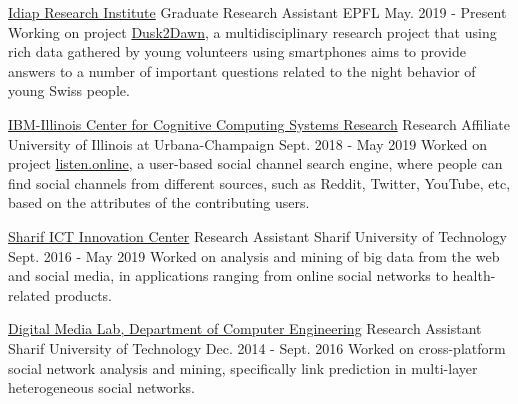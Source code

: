 \begin{cventries}

  \cventry
    {\href{https://idiap.ch}{Idiap Research Institute}}
    {Graduate Research Assistant}
    {EPFL}
    {May. 2019 - Present}
    {
      Working on project \href{http://www.idiap.ch/project/dusk2dawn/}{Dusk2Dawn}, a multidisciplinary research project that using rich data gathered by young volunteers using smartphones aims to provide answers to a number of important questions related to the night behavior of young Swiss people. 
    }

  \cventry
    {\href{https://www.c3sr.com/participants/}{IBM-Illinois Center for Cognitive Computing Systems Research}}
    {Research Affiliate}
    {University of Illinois at Urbana-Champaign}
    {Sept. 2018 - May 2019}
    {
      Worked on project \href{http://listen.online}{listen.online}, a user-based social channel search engine, where people can find social channels from different sources, such as Reddit, Twitter, YouTube, etc, based on the attributes of the contributing users. %
    }
    
  \cventry
    {\href{https://www.linkedin.com/company/sharif-ict-innovation-center/}{Sharif ICT Innovation Center}}
    {Research Assistant}
    {Sharif University of Technology}
    {Sept. 2016 - May 2019}
    {
      Worked on analysis and mining of big data from the web and social media, in applications ranging from online social networks to health-related products.
    }
    
  \cventry
    {\href{http://dml.ce.sharif.edu/dmlsite/?q=people}{Digital Media Lab, Department of Computer Engineering}}
    {Research Assistant}
    {Sharif University of Technology}
    {Dec. 2014 - Sept. 2016}
    {
      Worked on cross-platform social network analysis and mining, specifically link prediction in multi-layer heterogeneous social networks.
    }
\end{cventries}

